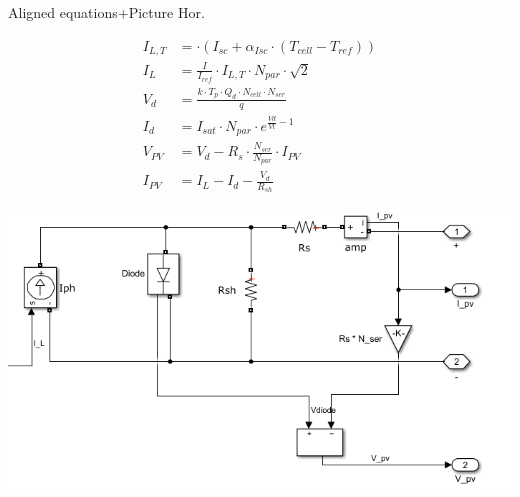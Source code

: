 \documentclass[xcolor=dvipsnames,aspectratio=169]{beamer} %
\begin{document}
\begin{frame}[noframenumbering]{Aligned equations+Picture Hor.}

\vspace{-12pt}

\begin{minipage}{0.4\paperwidth}

\begin{align*}
    I_{L,T} &= \cdot (I_{sc}+\alpha_{Isc} \cdot (T_{cell}-T_{ref})) \\
    I_L &= \frac{I}{I_{ref}} \cdot I_{L,T} \cdot N_{par} \cdot \sqrt{2} \\
    V_d &= \frac{k \cdot T_p \cdot Q_d \cdot N_{cell} \cdot N_{ser}}{q} \\
    I_d &= I_{sat} \cdot N_{par} \cdot e^{\frac{Vd}{Vt}-1} \\
    V_{PV} &= V_d-R_s \cdot \frac{N_{ser}}{N_{par}} \cdot I_{PV} \\
    I_{PV} &= I_L-I_d-\frac{V_d}{R_{sh}}
\end{align*}

\end{minipage}
\begin{minipage}{0.5\paperwidth}

\includegraphics[width=0.5\paperwidth]{Immagini/scheme.png}

\end{minipage}

\end{frame}

\end{document}
